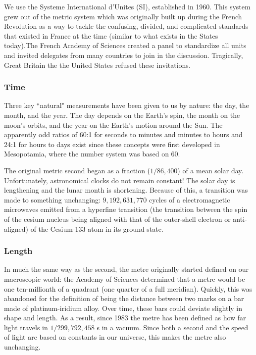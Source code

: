 \documentclass[letterpaper,12pt]{article}
\begin{document}
We use the Systeme International d'Unites (SI), established in 1960. This system grew out of the metric system which was originally built up during the French Revolution as a way to tackle the confusing, divided, and complicated standards that existed in France at the time (similar to what exists in the States today).The French Academy of Sciences created a panel to standardize all units and invited delegates from many countries to join in the discussion. Tragically, Great Britain the the United States refused these invitations. 

\subsubsection{Time}\label{sec:time}

Three key ``natural" measurements have been given to us by nature: the day, the month, and the year. The day depends on the Earth's spin, the month on the moon's orbits, and the year on the Earth's motion around the Sun. The apparently odd ratios of 60:1 for seconds to minutes and minutes to hours and 24:1 for hours to days exist since these concepts were first developed in Mesopotamia, where the number system was based on 60.

The original metric second began as a fraction ($1/86,400$) of a mean solar day. Unfortunately, astronomical clocks do not remain constant! The solar day is lengthening and the lunar month is shortening. Because of this, a transition was made to something unchanging: $9,192,631,770$ cycles of a electromagnetic microwaves emitted from a hyperfine transition (the transition between the spin of the cesium nucleus being aligned with that of the outer-shell electron or anti-aligned) of the Cesium-133 atom in its ground state.

\subsubsection{Length}\label{sec:length}

In much the same way as the second, the metre originally started defined on our macroscopic world: the Academy of Sciences determined that a metre would be one ten-millionth of a quadrant (one quarter of a full meridian). Quickly, this was abandoned for the definition of being the distance between two marks on a bar made of platinum-iridium alloy. Over time, these bars could deviate slightly in shape and length. As a result, since 1983 the metre has been defined as how far light travels in $1/299,792,458$ s in a vacuum. Since both a second and the speed of light are based on constants in our universe, this makes the metre also unchanging.
\end{document}
